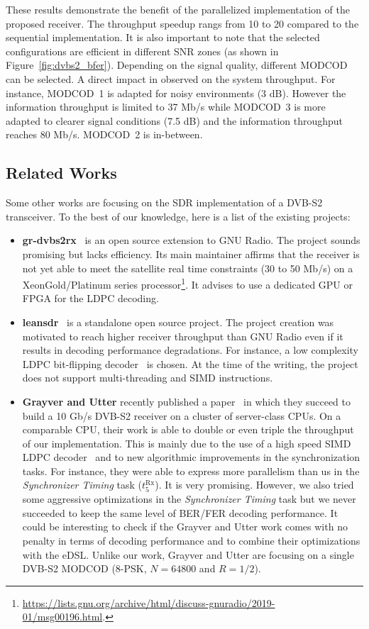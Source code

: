 These results demonstrate the benefit of the parallelized implementation of the
proposed receiver. The throughput speedup rangs from 10 to 20 compared to the
sequential implementation. It is also important to note that the selected
configurations are efficient in different SNR zones (as shown in
Figure~\ref{fig:dvbs2_bfer}). Depending on the signal quality, different MODCOD
can be selected. A direct impact in observed on the system throughput. For
instance, MODCOD~1 is adapted for noisy environments (3 dB). However the
information throughput is limited to 37 Mb/s while MODCOD~3 is more adapted to
clearer  signal conditions (7.5 dB) and the information throughput reaches
80 Mb/s. MODCOD~2 is in-between.

\subsection{Related Works}

Some other works are focusing on the SDR implementation of a DVB-S2 transceiver.
To the best of our knowledge, here is a list of the existing projects:
\begin{itemize}
  \item \textbf{gr-dvbs2rx}~\cite{gr-dvbs2rx} is an open source extension to GNU
    Radio. The project sounds promising but lacks efficiency. Its main
    maintainer affirms that the receiver is not yet able to meet the satellite
    real time constraints (30 to 50 Mb/s) on a Xeon\TM Gold/Platinum series
    processor\footnote{\url{https://lists.gnu.org/archive/html/discuss-gnuradio/2019-01/msg00196.html}.}.
    It advises to use a dedicated GPU or FPGA for the LDPC decoding.
  \item \textbf{leansdr}~\cite{leansdr} is a standalone open source project. The
    project creation was motivated to reach higher receiver throughput than GNU
    Radio even if it results in decoding performance degradations. For instance,
    a low complexity LDPC bit-flipping decoder~\cite{Ryan2009} is chosen. At the
    time of the writing, the project does not support multi-threading and SIMD
    instructions.
  \item \textbf{Grayver and Utter} recently published a paper~\cite{Grayver2020}
    in which they succeed to build a 10 Gb/s DVB-S2 receiver on a cluster of
    server-class CPUs. On a comparable CPU, their work is able to double or even
    triple the throughput of our implementation. This is mainly due to the use
    of a high speed SIMD LDPC decoder~\cite{LeGal2016,Grayver2019} and to new
    algorithmic improvements in the synchronization tasks. For instance, they
    were able to express more parallelism than us in the \emph{Synchronizer
    Timing} task ($t^\text{Rx}_{5}$). It is very promising. However, we also
    tried some aggressive optimizations in the \emph{Synchronizer Timing} task
    but we never succeeded to keep the same level of BER/FER decoding
    performance. It could be interesting to check if the Grayver and Utter work
    comes with no penalty in terms of decoding performance and to combine their
    optimizations with the \AFFECT eDSL. Unlike our work, Grayver and Utter are
    focusing on a single DVB-S2 MODCOD (8-PSK, $N = 64800$ and $R = 1/2$).
\end{itemize}

